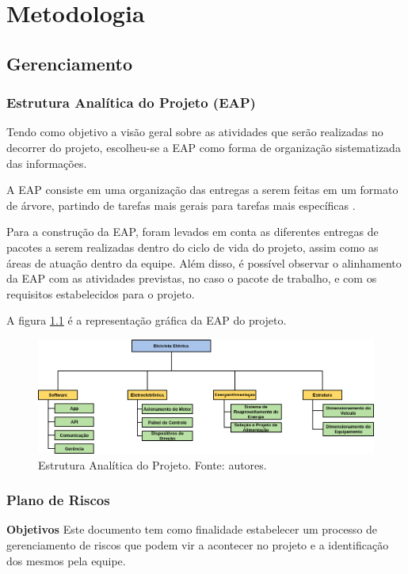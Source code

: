 \chapter{Metodologia}
  \section{Gerenciamento}
    \subsection{Estrutura Analítica do Projeto (EAP)}

      Tendo como objetivo a visão geral sobre as atividades que serão
      realizadas no decorrer do projeto, escolheu-se a EAP como forma
      de organização sistematizada das informações.

      A EAP consiste em uma organização das entregas
      a serem feitas em um formato de árvore, partindo de tarefas
      mais gerais para tarefas mais específicas \cite{pmbok2012}.

      Para a construção da EAP, foram levados em conta as diferentes
      entregas de pacotes a serem realizadas dentro do ciclo de vida do projeto,
      assim como as áreas de atuação dentro da equipe. Além disso, é
      possível observar o alinhamento da EAP com as atividades previstas, no caso o pacote de trabalho, e com os requisitos estabelecidos para o projeto.

      A figura \ref{fig:eap} é a representação gráfica da EAP do projeto.

      \begin{figure}[!htbp]
        \centering
        \includegraphics[width=\textwidth]{figuras/Eap.png}
        \caption{Estrutura Analítica do Projeto. Fonte: autores.}
        \label{fig:eap}
      \end{figure}

      \vfill
      \pagebreak

	\subsection{Plano de Riscos}
	\textbf{Objetivos}
		Este documento tem como finalidade estabelecer um processo de gerenciamento de riscos que podem vir a acontecer no projeto e a identificação dos mesmos pela equipe.
		
